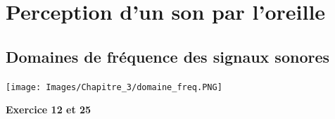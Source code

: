 \section{Perception d'un son par l'oreille}
\subsection{Domaines de fréquence des signaux sonores}
\begin{tcolorbox}[colback=red!5!white,colframe=red!75!black,title=\textbf{Fréquences des signaux sonores : }]
\vspace{2cm}
\begin{center}
    \texttt{[image: Images/Chapitre\_3/domaine\_freq.PNG]}
\end{center}
\vspace{1cm}%
\end{tcolorbox}
\begin{Large}
\end{Large}\textbf{Exercice 12 et 25}


